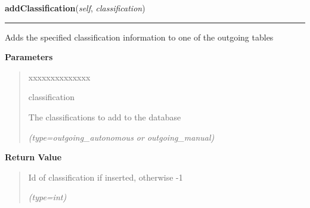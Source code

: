     \vspace{0.5ex}

\hspace{.8\funcindent}\begin{boxedminipage}{\funcwidth}

    \raggedright \textbf{addClassification}(\textit{self}, \textit{classification})

    \vspace{-1.5ex}

    \rule{\textwidth}{0.5\fboxrule}
\setlength{\parskip}{2ex}
    Adds the specified classification information to one of the outgoing 
    tables

\setlength{\parskip}{1ex}
      \textbf{Parameters}
      \vspace{-1ex}

      \begin{quote}
        \begin{Ventry}{xxxxxxxxxxxxxx}

          \item[classification]

          The classifications to add to the database

            {\it (type=outgoing\_autonomous or outgoing\_manual)}

        \end{Ventry}

      \end{quote}

      \textbf{Return Value}
    \vspace{-1ex}

      \begin{quote}
      Id of classification if inserted, otherwise -1

      {\it (type=int)}

      \end{quote}

    \end{boxedminipage}

    \label{src:dao:classification_dao:ClassificationDAO:getClassificationByUID}

    \vspace{0.5ex}

